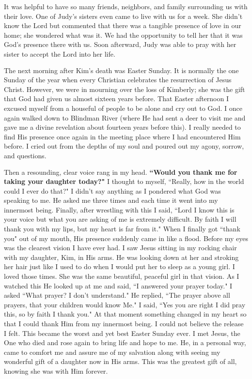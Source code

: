 \documentclass[oneside,12pt]{book}
\begin{document}
It was helpful to have so many friends, neighbors, and family surrounding us with their love. One of Judy's sisters even came to live with us for a week. She didn't know the Lord but commented that there was a tangible presence of love in our home; she wondered what was it. We had the opportunity to tell her that it was God's presence there with us. Soon afterward, Judy was able to pray with her sister to accept the Lord into her life.

The next morning after Kim's death was Easter Sunday. It is normally the one Sunday of the year when every Christian celebrates the resurrection of Jesus Christ. However, we were in mourning over the loss of Kimberly; she was the gift that God had given us almost sixteen years before. That Easter afternoon I excused myself from a houseful of people to be alone and cry out to God. I once again walked down to Blindman River (where He had sent a deer to visit me and gave me a divine revelation about fourteen years before this). I really needed to find His presence once again in the meeting place where I had encountered Him before. I cried out from the depths of my soul and poured out my agony, sorrow, and questions.

Then a resounding, clear voice rang in my head. \textbf{``Would you thank me for taking your daughter today?"} I thought to myself, ``Really, how in the world could I ever do that?" I didn't say anything as I pondered what God was speaking to me. He asked me three times and each time it went into my innermost being. Finally, after wrestling with this I said, ``Lord I know this is your voice but what you are asking of me is extremely difficult. By faith I will thank you with my lips, but my heart is far from it." When I finally got ``thank you" out of my mouth, His presence suddenly came in like a flood. Before my eyes was the clearest vision I have ever had. I saw Jesus sitting in my rocking chair with my daughter, Kim, in His arms. He was looking down at her and stroking her hair just like I used to do when I would put her to sleep as a young girl. I loved those times. She was the same beautiful, peaceful girl in that vision. As I watched this He looked up at me and said, ``I answered your prayer today." I asked ``What prayer? I don't understand." He replied, ``The prayer above all prayers, that your children would know Me." I said, ``Yes you are right I did pray this, so by faith I thank you." At that moment something changed in my heart so that I could thank Him from my innermost being. I could not believe the release I felt.  This became the worst and yet best Easter Sunday ever. I met Jesus, the One who died and rose again to bring life and hope to me. He, in a personal way, came to comfort me and assure me of my salvation along with seeing my wonderful gift of a daughter now in His arms. This was the greatest gift of all, knowing she was with Him forever.
\end{document}
